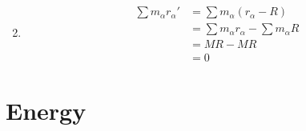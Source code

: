 \documentclass{article}
\begin{document}
\setcounter{subsection}{36}
\subsection{}

\begin{enumerate}
  \setcounter{enumi}{1}
  \item

        \begin{align*}
          \sum m_\alpha r_\alpha' & = \sum m_\alpha (r_\alpha - R)             \\
                                  & = \sum m_\alpha r_\alpha - \sum m_\alpha R \\
                                  & = M R - M R                                \\
                                  & = 0
        \end{align*}
\end{enumerate}

\section{Energy}

\setcounter{subsection}{2}
\subsection{}
\end{document}
